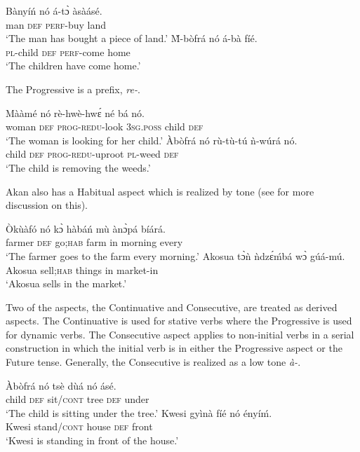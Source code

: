 \documentclass[output=paper]{langsci/langscibook}
\begin{document}
\ea\label{ex:4.osam}
\ea\label{ex:4a.osam}
\gll  Bànyíń nó  á-tɔ̀     àsàásé.\\
       man  \textsc{def}  \textsc{perf}-buy  land\\
\glt `The man has bought a piece of land.'
\ex\label{ex:4b.osam}
\gll \`{M}-bòfrá  nó  á-bà    fíé.\\
     \textsc{pl}-child  \textsc{def}  \textsc{perf}-come  home\\
\glt `The children have come home.'
\z 
\z 

The Progressive is a prefix, \textit{re-}.

\ea\label{ex:5.osam}
\ea\label{ex:5a.osam}
\gll Mààmé   nó  rè-hwè-hwɛ́     né    bá   nó.\\
       woman    \textsc{def}  \textsc{prog-redu}-look  \textsc{3sg.poss}  child  \textsc{def}\\
\glt `The woman is looking for her child.'
\ex\label{ex:5b.osam}
\gll   Àbòfrá  nó  rù-tù-tú    ǹ-wúrá    nó.\\
       child  \textsc{def}  \textsc{prog-redu}-uproot  \textsc{pl}-weed  \textsc{def}\\
\glt `The child is removing the weeds.'
\z 
\z 

Akan also has a Habitual aspect which is realized by tone (see \citealt{dolphyne1988} for more discussion on this).

\ea\label{ex:6.osam}
\ea\label{ex:6a.osam}
\gll Òkùàfó  nó   kɔ̀    hàbáń  mù  ànɔ̀pá    bíárá.\\
       farmer  \textsc{def}  go;\textsc{hab}    farm  in  morning  every\\
\glt `The farmer goes to the farm every morning.'
\ex\label{ex:6b.osam}
\gll Akosua    tɔ̀ǹ     ǹdzɛ́ḿbá  wɔ̀  gúá-mú.\\
       Akosua  sell;\textsc{hab}  things    in  market-in\\
\glt `Akosua sells in the market.'
\z 
\z 


Two of the aspects, the Continuative and Consecutive, are treated as derived aspects. The Continuative is used for stative verbs where the Progressive is used for dynamic verbs. The Consecutive aspect applies to non-initial verbs in a serial construction in which the initial verb is in either the Progressive aspect or the Future tense. Generally, the Consecutive is realized as a low tone \textit{à-}.

\ea\label{ex:7.osam}
\ea\label{ex:7a.osam}
\gll   Àbòfrá  nó  tsè    dùá  nó  ásé.\\
       child  \textsc{def}  sit/\textsc{cont}  tree  \textsc{def}  under\\
\glt `The child is sitting under the tree.'
\ex\label{ex:7b.osam}
\gll Kwesi  gyìnà    fíé  nó  ényíḿ.\\
       Kwesi  stand/\textsc{cont}  house  \textsc{def}  front\\
\glt `Kwesi is standing in front of the house.'
\z 
\z 
\end{document}
